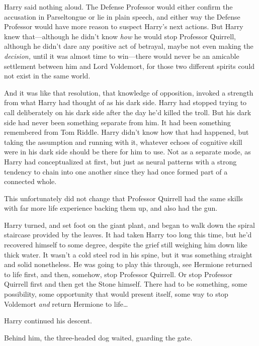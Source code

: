 Harry said nothing aloud. The Defense Professor would either confirm the 
accusation in Parseltongue or lie in plain speech, and either way the Defense 
Professor would have more reason to suspect Harry's next actions. But Harry 
knew that---although he didn't know \emph{how} he would stop Professor 
Quirrell, although he didn't dare any positive act of betrayal, maybe not even 
making the \emph{decision,} until it was almost time to win---there would never 
be an amicable settlement between him and Lord Voldemort, for those two 
different spirits could not exist in the same world.

And it was like that resolution, that knowledge of opposition, invoked a 
strength from what Harry had thought of as his dark side. Harry had stopped 
trying to call deliberately on his dark side after the day he'd killed the 
troll. But his dark side had never been something separate from him. It had 
been something remembered from Tom Riddle. Harry didn't know how that had 
happened, but taking the assumption and running with it, whatever echoes of 
cognitive skill were in his dark side should be there for him to use. Not as a 
separate mode, as Harry had conceptualized at first, but just as neural 
patterns with a strong tendency to chain into one another since they had once 
formed part of a connected whole.

This unfortunately did not change that Professor Quirrell had the same skills 
with far more life experience backing them up, and also had the gun.

Harry turned, and set foot on the giant plant, and began to walk down the 
spiral staircase provided by the leaves. It had taken Harry too long this time, 
but he'd recovered himself to some degree, despite the grief still weighing him 
down like thick water. It wasn't a cold steel rod in his spine, but it was 
something straight and solid nonetheless. He was going to play this through, 
see Hermione returned to life first, and then, somehow, stop Professor 
Quirrell. Or stop Professor Quirrell first and then get the Stone himself. 
There had to be something, some possibility, some opportunity that would 
present itself, some way to stop Voldemort \emph{and} return Hermione to 
life{\ldots}

Harry continued his descent.

Behind him, the three-headed dog waited, guarding the gate.
